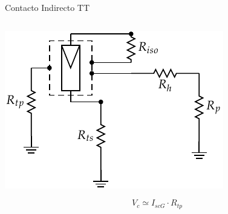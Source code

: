 \documentclass[xcolor={usenames,svgnames,dvipsnames}]{beamer}
\begin{document}
\begin{frame}[label={sec:org0965e01}]{Contacto Indirecto TT}
\begin{columns}
\begin{column}{0.5\columnwidth}
\begin{center}
\includegraphics[width=\textwidth]{../figs/ContactoIndirectoTT.pdf}
\end{center}
$$V_{c}\simeq I_{scG}\cdot R_{tp}$$
\end{column}


\end{columns}
\end{frame}
\end{document}
